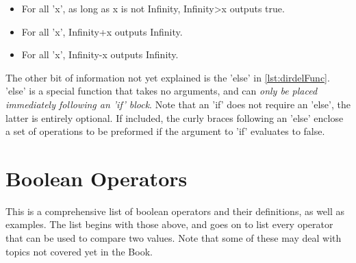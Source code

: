 \begin{itemize}
\item For all 'x', as long as x is not Infinity, Infinity>x outputs true.
\item For all 'x', Infinity+x outputs Infinity.
\item For all 'x', Infinity-x outputs Infinity.
\end{itemize}
The other bit of information not yet explained is the 'else' in \ref{lst:dirdelFunc}. 'else' is a special function that takes no arguments, and can \emph{only be placed immediately following an 'if' block}. Note that an 'if' does not require an 'else', the latter is entirely optional. If included, the curly braces following an 'else' enclose a set of operations to be preformed if the argument to 'if' evaluates to false.

\section{Boolean Operators}
This is a comprehensive list of boolean operators and their definitions, as well as examples. The list begins with those above, and goes on to list every operator that can be used to compare two values. Note that some of these may deal with topics not covered yet in the Book. \\
